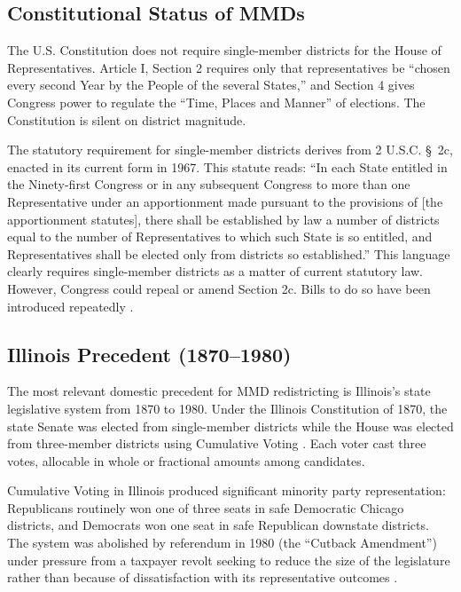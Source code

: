 \subsection{Constitutional Status of MMDs}

The U.S. Constitution does not require single-member districts for the House
of Representatives.  Article I, Section 2 requires only that representatives
be ``chosen every second Year by the People of the several States,'' and
Section 4 gives Congress power to regulate the ``Time, Places and Manner''
of elections.  The Constitution is silent on district magnitude.

The statutory requirement for single-member districts derives from 2 U.S.C.
\S~2c, enacted in its current form in 1967.  This statute reads: ``In each
State entitled in the Ninety-first Congress or in any subsequent Congress to
more than one Representative under an apportionment made pursuant to the
provisions of [the apportionment statutes], there shall be established by
law a number of districts equal to the number of Representatives to which
such State is so entitled, and Representatives shall be elected only from
districts so established.''  This language clearly requires single-member
districts as a matter of current statutory law.  However, Congress could
repeal or amend Section 2c.  Bills to do so have been introduced repeatedly
\citep{fair_rep_act_2019}.

\subsection{Illinois Precedent (1870--1980)}

The most relevant domestic precedent for MMD redistricting is Illinois's
state legislative system from 1870 to 1980.  Under the Illinois Constitution
of 1870, the state Senate was elected from single-member districts while the
House was elected from three-member districts using Cumulative Voting
\citep{cole2001cumulative}.  Each voter cast three votes, allocable in whole
or fractional amounts among candidates.

Cumulative Voting in Illinois produced significant minority party
representation: Republicans routinely won one of three seats in safe
Democratic Chicago districts, and Democrats won one seat in safe Republican
downstate districts.  The system was abolished by referendum in 1980
(the ``Cutback Amendment'') under pressure from a taxpayer revolt seeking to
reduce the size of the legislature rather than because of dissatisfaction
with its representative outcomes \citep{cole2001cumulative}.

